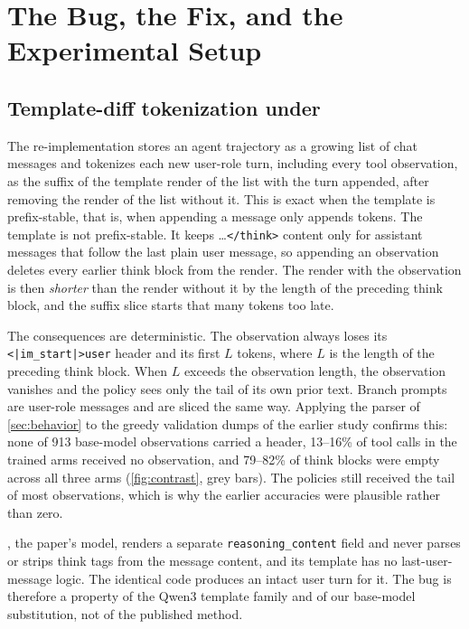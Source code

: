 \section{The Bug, the Fix, and the Experimental Setup}
\label{sec:setup}

\subsection{Template-diff tokenization under \qwen{}}
\label{sec:bug}

The re-implementation stores an agent trajectory as a growing list of chat messages and
tokenizes each new user-role turn, including every tool observation, as the suffix of the
template render of the list with the turn appended, after removing the render of the list
without it. This is exact when the template is prefix-stable, that is, when appending a
message only appends tokens. The \qwen{} template is not prefix-stable. It keeps
\think{}\ldots\texttt{</think>} content only for assistant messages that follow the last plain
user message, so appending an observation deletes every earlier think block from the render.
The render with the observation is then \emph{shorter} than the render without it by the
length of the preceding think block, and the suffix slice starts that many tokens too late.

The consequences are deterministic. The observation always loses its
\texttt{<|im\_start|>user} header and its first $L$ tokens, where $L$ is the length of the
preceding think block. When $L$ exceeds the observation length, the observation vanishes and
the policy sees only the tail of its own prior text. Branch prompts are user-role messages and
are sliced the same way. Applying the parser of \cref{sec:behavior} to the greedy validation
dumps of the earlier study confirms this: none of 913 base-model observations carried a
header, 13--16\% of tool calls in the trained arms received no observation, and 79--82\% of
think blocks were empty across all three arms (\cref{fig:contrast}, grey bars). The policies
still received the tail of most observations, which is why the earlier accuracies were
plausible rather than zero.

\seedoss{}, the paper's model, renders a separate \texttt{reasoning\_content} field and never
parses or strips think tags from the message content, and its template has no
last-user-message logic. The identical code produces an intact user turn for it. The bug is
therefore a property of the Qwen3 template family and of our base-model substitution, not of
the published method.

